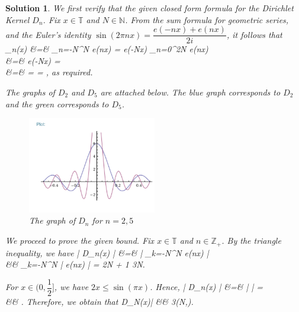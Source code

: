 \documentclass{article} %
\def\eQb#1\eQe{\begin{eqnarray*}#1\end{eqnarray*}}
\theoremstyle{quest}
\newtheorem*{solution}{Solution}
\begin{document}
\begin{solution}
We first verify that the given closed form formula for the Dirichlet Kernel $D_n$. Fix 
$x \in \mathbb{T}$ and $N \in \mathbb{N}$. 
From the sum formula for geometric series, and the Euler's identity $
\sin(2\pi nx) = \dfrac{e(-nx) + e(nx)}{2i}$, it follows that 
\eQb
D_{n}(x) &=& \sum_{n=-N}^{N} e(nx) = e(-Nx) \sum_{n=0}^{2N} e(nx) \\
&=& e(-Nx)  =  \\
&=&  
=  =
,
\eQe
as required.

\pagebreak

 The graphs of $D_2$ and $D_5$ are attached below. The blue graph
corresponds to $D_2$ and the green corresponds to $D_5$.
\begin{figure}[!ht]
  \caption{The graph of $D_n$ for $n=2,5$}
  \centering
    \includegraphics[width=0.5\textwidth]{Dirichlet-plot}
\end{figure}

\smallskip

We proceed to prove the given bound. Fix $x \in \mathbb{T}$ and
$n \in \mathbb{Z}_{+}$. By the triangle inequality, we have
\eQb
\left| D_n(x) \right| &=& \left| \sum_{k=-N}^{N} e(nx) \right| \\ 
&\leq& \sum_{k=-N}^{N} \left| e(nx) \right| = 2N + 1 \leq 3N. \\ 
\eQe

For $ x \in (0,\dfrac{1}{2}]$, we have $2x \leq \sin(\pi x)$. Hence, 
\eQb
\left| D_n(x) \right| 
&=& \left|  \right| = 
  \\
&\leq&   \leq {}.
\eQe
Therefore, we obtain that
\eQb
|D_N(x)| &\leq& 3\min(N,). \\
\eQe


\end{solution}
\end{document}
